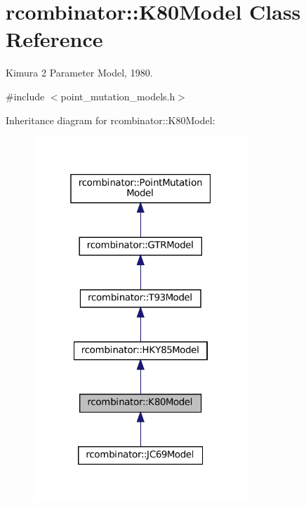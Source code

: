 \hypertarget{classrcombinator_1_1K80Model}{}\section{rcombinator\+:\+:K80\+Model Class Reference}
\label{classrcombinator_1_1K80Model}


Kimura 2 Parameter Model, 1980.  




{\ttfamily \#include $<$point\+\_\+mutation\+\_\+models.\+h$>$}



Inheritance diagram for rcombinator\+:\+:K80\+Model\+:\nopagebreak
\begin{figure}[H]
\begin{center}
\leavevmode
\includegraphics[width=229pt]{classrcombinator_1_1K80Model__inherit__graph}
\end{center}
\end{figure}



